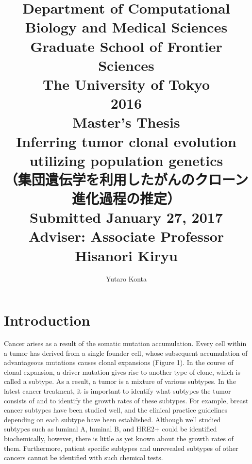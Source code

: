 \documentclass[12pt]{article}
\begin{document}
\title{{\large Department of Computational Biology and Medical Sciences\\Graduate School of Frontier Sciences\\The University of Tokyo}\vspace{4cm}\\2016\\Master's Thesis\vspace{1cm}\\Inferring tumor clonal evolution utilizing population genetics\\（集団遺伝学を利用したがんのクローン進化過程の推定）\vspace{3cm}\\{\large Submitted January 27, 2017\\Adviser: Associate Professor Hisanori Kiryu}\vspace{3cm}}
\author{{\Large Yutaro Konta}}
\date{}
\maketitle
\thispagestyle{empty}
\newpage

{}

\section{Introduction}
Cancer arises as a result of the somatic mutation accumulation. Every cell within a tumor has derived from a single founder cell, whose subsequent accumulation of advantageous mutations causes clonal expansions (Figure 1). In the course of clonal expansion, a driver mutation gives rise to another type of clone, which is called a subtype. As a result, a tumor is a mixture of various subtypes. In the latest cancer treatment, it is important to identify what subtypes the tumor consists of and to identify the growth rates of these subtypes. For example, breast cancer subtypes have been studied well, and the clinical practice guidelines depending on each subtype have been established. Although well studied subtypes such as luminal A, luminal B, and HRE2+ could be identified biochemically, however, there is little as yet known about the growth rates of them. Furthermore, patient specific subtypes and unrevealed subtypes of other cancers cannot be identified with such chemical tests.
\end{document}
